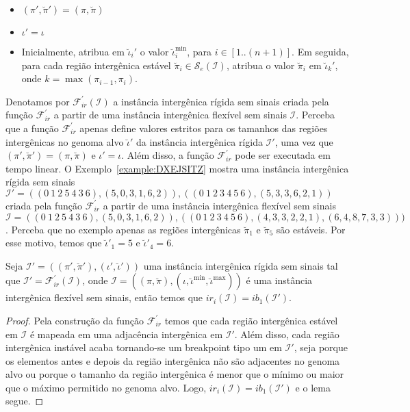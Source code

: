 \begin{itemize}
  \item $(\pi',\breve\pi') = (\pi,\breve\pi)$
  \item $\iota' = \iota$
  \item Inicialmente, atribua em $\breve\iota_{i}'$ o valor $\breve\iota^{\min}_i$, para $i \in [1..({n+1})]$. Em seguida, para cada região intergênica estável $\breve\pi_i \in \mathcal{S}_{e}(\mathcal{I})$, atribua o valor $\breve\pi_i$ em $\breve\iota_{k}'$, onde $k = \max(\pi_{i-1},\pi_i)$.
\end{itemize}

Denotamos por $\mathcal{F}_{ir}^{'}(\mathcal{I})$ a instância intergênica rígida sem sinais criada pela função $\mathcal{F}_{ir}^{'}$ a partir de uma instância intergênica flexível sem sinais $\mathcal{I}$. Perceba que a função $\mathcal{F}_{ir}^{'}$ apenas define valores estritos para os tamanhos das regiões intergênicas no genoma alvo $\breve\iota'$ da instância intergênica rígida $\mathcal{I'}$, uma vez que $(\pi',\breve\pi') = (\pi,\breve\pi)$ e $\iota' = \iota$. Além disso, a função $\mathcal{F}_{ir}^{'}$ pode ser executada em tempo linear. O Exemplo~\ref{example:DXEJSITZ} mostra uma instância intergênica rígida sem sinais $\mathcal{I}' = ((0~1~2~5~4~3~6),(5,0,3,1,6,2)),((0~1~2~3~4~5~6),(5,3,3,6,2,1))$ criada pela função $\mathcal{F}_{ir}^{'}$ a partir de uma instância intergênica flexível sem sinais $\mathcal{I}=((0~1~2~5~4~3~6),(5,0,3,1,6,2)),((0~1~2~3~4~5~6),(4,3,3,2,2,1),(6,4,8,7,3,3)))$. Perceba que no exemplo apenas as regiões intergênicas $\breve\pi_1$ e $\breve\pi_5$ são estáveis. Por esse motivo, temos que $\breve\iota'_1 = 5$ e $\breve\iota'_4 = 6$.



\begin{lemma}\label{lemma:UFTVNRSX}
Seja $\mathcal{I'} = ((\pi',\breve\pi'),(\iota',\breve\iota'))$ uma instância intergênica rígida sem sinais tal que $\mathcal{I'} = \mathcal{F}_{ir}^{'}(\mathcal{I})$, onde $\mathcal{I} = ((\pi,\breve\pi),(\iota,\breve\iota^{\min},\breve\iota^{\max}))$ é uma instância intergênica flexível sem sinais, então temos que $ir_i(\mathcal{I}) = ib_1(\mathcal{I'})$.
\end{lemma}
\begin{proof}
Pela construção da função $\mathcal{F}_{ir}^{'}$ temos que cada região intergênica estável em $\mathcal{I}$ é mapeada em uma adjacência intergênica em $\mathcal{I'}$. Além disso, cada região intergênica instável acaba tornando-se um breakpoint tipo um em $\mathcal{I'}$, seja porque os elementos antes e depois da região intergênica não são adjacentes no genoma alvo ou porque o tamanho da região intergênica é menor que o mínimo ou maior que o máximo permitido no genoma alvo. Logo, $ir_i(\mathcal{I}) = ib_1(\mathcal{I'})$ e o lema segue.
\end{proof}

